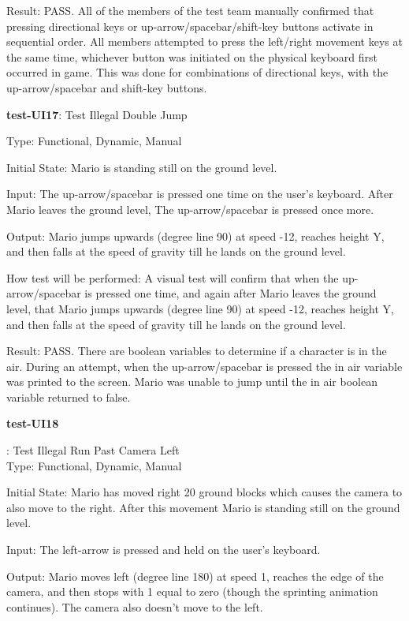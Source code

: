 \documentclass[12pt, titlepage]{article}
\begin{document}
\begin{enumerate}
{Result: PASS. All of the members of the test team manually confirmed that pressing directional keys or up-arrow/spacebar/shift-key buttons activate in sequential order. All members attempted to press the left/right movement keys at the same time, whichever button was initiated on the physical keyboard first occurred in game. This was done for combinations of directional keys, with the up-arrow/spacebar and shift-key buttons.

\item{\textbf{test-UI17}: Test Illegal Double Jump\\}

Type: Functional, Dynamic, Manual
					
Initial State: Mario is standing still on the ground level.
					
Input: The up-arrow/spacebar is pressed one time on the user's keyboard. After Mario leaves the ground level, The up-arrow/spacebar is pressed once more.
					
Output: Mario jumps upwards (degree line 90) at speed -12, reaches height Y, and then falls at the speed of gravity till he lands on the ground level.
					
How test will be performed: A visual test will confirm that when the up-arrow/spacebar is pressed one time, and again after Mario leaves the ground level, that Mario jumps upwards (degree line 90) at speed -12, reaches height Y, and then falls at the speed of gravity till he lands on the ground level.

Result: PASS. There are boolean variables to determine if a character is in the air. During an attempt, when the up-arrow/spacebar is pressed the in air variable was printed to the screen. Mario was unable to jump until the in air boolean variable returned to false.

\textbf{test-UI18}}: Test Illegal Run Past Camera Left\\

Type: Functional, Dynamic, Manual
					
Initial State: Mario has moved right 20 ground blocks which causes the camera to also move to the right. After this movement Mario is standing still on the ground level.
					
Input: The left-arrow is pressed and held on the user's keyboard.
					
Output: Mario moves left (degree line 180) at speed 1, reaches the edge of the camera, and then stops with 1 equal to zero (though the sprinting animation continues). The camera also doesn't move to the left.
					

\end{enumerate}
\end{document}

